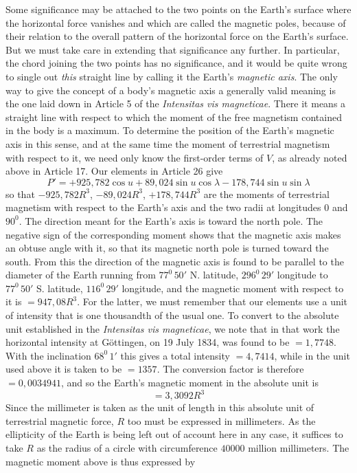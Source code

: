Some significance may be attached to the two points on the Earth's surface where the horizontal force vanishes and which are called the magnetic poles, because of their relation to the overall pattern of the horizontal force on the Earth's surface. But we must take care in extending that significance any further. In particular, the chord joining the two points has no significance, and it would be quite wrong to single out \textit{this} straight line by calling it the Earth's \textit{magnetic axis}. The only way to give the concept of a body's magnetic axis a
generally valid meaning is the one laid down in Article 5 of the \textit{Intensitas vis magneticae}. There it means a straight line with respect to which the moment of the free magnetism contained in the body is a maximum. To determine the position of the Earth's magnetic axis in this sense, and at the same time the moment of terrestrial magnetism with respect to it, we need only know the first-order terms of $V$, as already noted above in Article 17. Our elements in Article 26 give
\[
P'=+925{,}782\cos u+89{,}024\sin u\cos\lambda-178{,}744\sin u\sin\lambda
\]
so that $-925{,}782R^3$, $-89{,}024R^3$, $+178{,}744R^3$ are the moments of terrestrial magnetism with respect to the Earth's axis and the two radii at longitudes $0$ and $90^0$. The direction meant for the Earth's axis is toward the north pole. The negative sign of the corresponding moment shows that the magnetic axis makes an obtuse angle with it, so that its magnetic north pole is turned toward the south. From this the direction of the magnetic axis is found to be parallel to the diameter of the Earth running from $77^0\,50'$ N. latitude, $296^0\,29'$ longitude to $77^0\,50'$ S. latitude, $116^0\,29'$ longitude, and the magnetic moment with respect to it is $=947{,}08R^3$. For the latter, we must remember that our elements use a unit of intensity that is one thousandth of the usual one. To convert to the absolute unit established in the \textit{Intensitas vis magneticae}, we note that in that work the horizontal intensity at Göttingen, on 19 July 1834, was found to be $=1{,}7748$. With the inclination $68^0\,1'$ this gives a total intensity $=4{,}7414$, while in the unit used above it is taken to be $=1357$. The conversion factor is therefore $=0{,}0034941$, and so the Earth's magnetic moment in the absolute unit is
\[
=3{,}3092R^3
\]
Since the millimeter is taken as the unit of length in this absolute unit of terrestrial magnetic force, $R$ too must be expressed in millimeters. As the ellipticity of the Earth is being left out of account here in any case, it suffices to take $R$ as the radius of a circle with circumference $40000$ million millimeters. The magnetic moment above is thus expressed by
